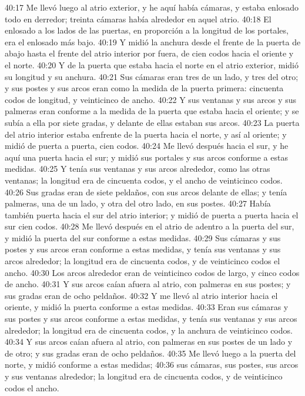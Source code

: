 40:17 Me llevó luego al atrio exterior, y he aquí había cámaras, y estaba enlosado todo en derredor; treinta cámaras había alrededor en aquel atrio.  
40:18 El enlosado a los lados de las puertas, en proporción a la longitud de los portales, era el enlosado más bajo.  
40:19 Y midió la anchura desde el frente de la puerta de abajo hasta el frente del atrio interior por fuera, de cien codos   hacia el oriente y el norte.  
40:20 Y de la puerta que estaba hacia el norte en el atrio exterior, midió su longitud y su anchura.  
40:21 Sus cámaras eran tres de un lado, y tres del otro; y sus postes y sus arcos eran como la medida de la puerta primera: cincuenta codos   de longitud, y veinticinco de ancho.  
40:22 Y sus ventanas y sus arcos y sus palmeras eran conforme a la medida de la puerta que estaba hacia el oriente; y se subía a ella por siete gradas, y delante de ellas estaban sus arcos. 
40:23 La puerta del atrio interior estaba enfrente de la puerta hacia el norte, y así al oriente; y midió de puerta a puerta, cien codos.  
40:24 Me llevó después hacia el sur, y he aquí una puerta hacia el sur; y midió sus portales y sus arcos conforme a estas medidas.  
40:25 Y tenía sus ventanas y sus arcos alrededor, como las otras ventanas; la longitud era de cincuenta codos,  y el ancho de veinticinco codos.  
40:26 Sus gradas eran de siete peldaños, con sus arcos delante de ellas; y tenía palmeras, una de un lado, y otra del otro lado, en sus postes.  
40:27 Había también puerta hacia el sur del atrio interior; y midió de puerta a puerta hacia el sur cien codos.  
40:28 Me llevó después en el atrio de adentro a la puerta del sur, y midió la puerta del sur conforme a estas medidas.  
40:29 Sus cámaras y sus postes y sus arcos eran conforme a estas medidas, y tenía sus ventanas y sus arcos alrededor; la longitud era de cincuenta codos,  y de veinticinco codos el ancho.  
40:30 Los arcos alrededor eran de veinticinco codos   de largo, y cinco codos de ancho.  
40:31 Y sus arcos caían afuera al atrio, con palmeras en sus postes; y sus gradas eran de ocho peldaños.  
40:32 Y me llevó al atrio interior hacia el oriente, y midió la puerta conforme a estas medidas.  
40:33 Eran sus cámaras y sus postes y sus arcos conforme a estas medidas, y tenía sus ventanas y sus arcos alrededor; la longitud era de cincuenta codos,  y la anchura de veinticinco codos.  
40:34 Y sus arcos caían afuera al atrio, con palmeras en sus postes de un lado y de otro; y sus gradas eran de ocho peldaños.  
40:35 Me llevó luego a la puerta del norte, y midió conforme a estas medidas;  
40:36 sus cámaras, sus postes, sus arcos y sus ventanas alrededor; la longitud era de cincuenta codos,  y de veinticinco codos el ancho.  
